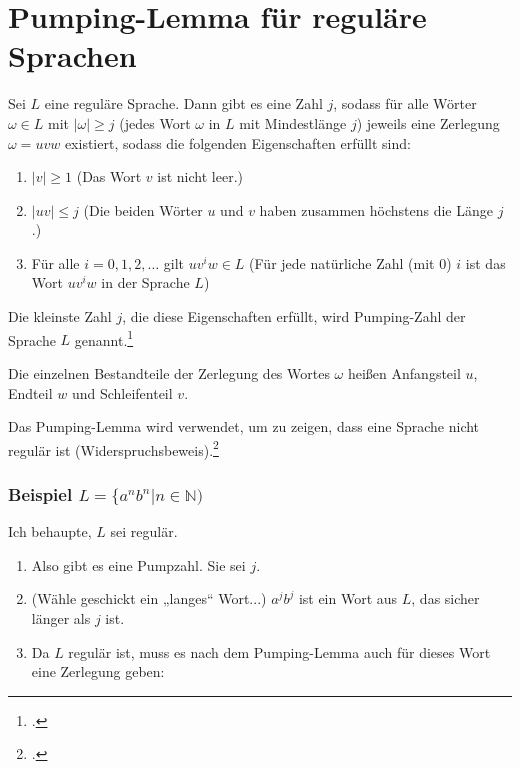 \documentclass{lehramt-informatik-haupt}
\begin{document}
\chapter{Pumping-Lemma für reguläre Sprachen}

%
\noindent
Sei $L$ eine reguläre Sprache. Dann gibt es eine Zahl $j$, sodass für
alle Wörter $\omega \in L$  mit $|\omega| \geq j$ (jedes Wort $\omega$
in $L$ mit Mindestlänge $j$) jeweils eine Zerlegung $\omega = uvw$
existiert, sodass die folgenden Eigenschaften erfüllt sind:

\begin{enumerate}
\item $|v| \geq 1$
(Das Wort $v$ ist nicht leer.)

\item $|uv| \leq j$
(Die beiden Wörter $u$ und $v$ haben zusammen höchstens die Länge $j$.)

\item Für alle $i = 0, 1, 2, \dots$ gilt $uv^iw \in L$
(Für jede natürliche Zahl (mit 0) $i$ ist das Wort $uv^{i}w$ in der
Sprache $L$)
\end{enumerate}

Die kleinste Zahl $j$, die diese Eigenschaften erfüllt, wird
Pumping-Zahl der Sprache $L$ genannt.\footcite{wiki:pumping-lemma}

Die einzelnen Bestandteile der Zerlegung des Wortes $\omega$ heißen
Anfangsteil $u$, Endteil $w$ und Schleifenteil $v$.%

\noindent
Das Pumping-Lemma wird verwendet, um zu zeigen, dass eine
Sprache nicht regulär ist (Widerspruchsbeweis).\footcite[Seite 63]{theo:fs:1}

%

\subsection{Beispiel $L = \{a^n b^n | n \in \mathbb{N})$}

Ich behaupte, $L$ sei regulär.

\begin{enumerate}
\item Also gibt es eine Pumpzahl. Sie sei $j$.

\item (Wähle geschickt ein „langes“ Wort...)
$a^j b^j$ ist ein Wort aus $L$, das sicher länger als $j$ ist.

\item Da $L$ regulär ist, muss es nach dem Pumping-Lemma auch für dieses
Wort eine Zerlegung geben:
\end{enumerate}
\end{document}
